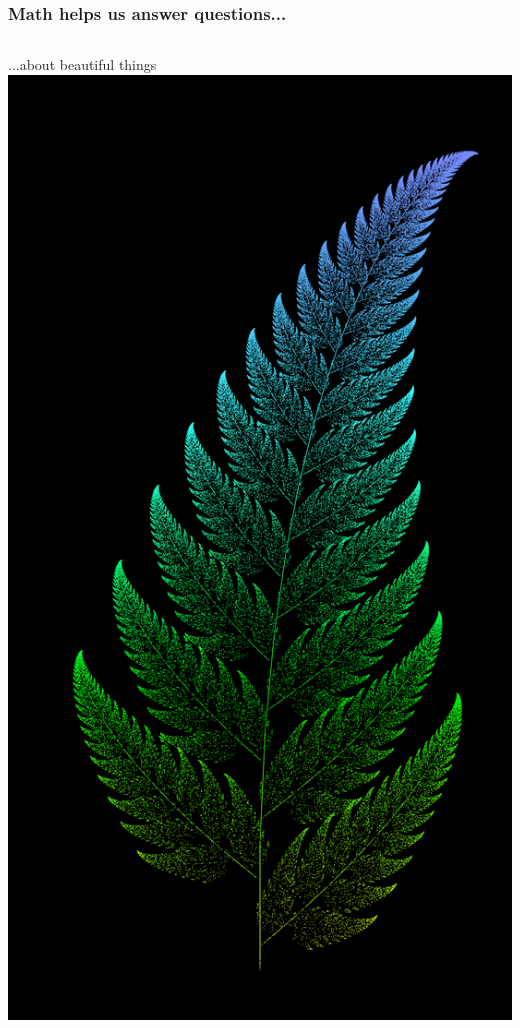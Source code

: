 \documentclass{beamer}
\theoremstyle{mystyle}
\begin{document}
\begin{frame}
\frametitle{Math helps us answer questions...}

\begin{center}
	\vspace{-0.1in}
	\begin{columns}
			...about beautiful things 
			\includegraphics[scale=0.017]{fern.png}

\end{columns}
\end{center}
\end{frame}
\end{document}
